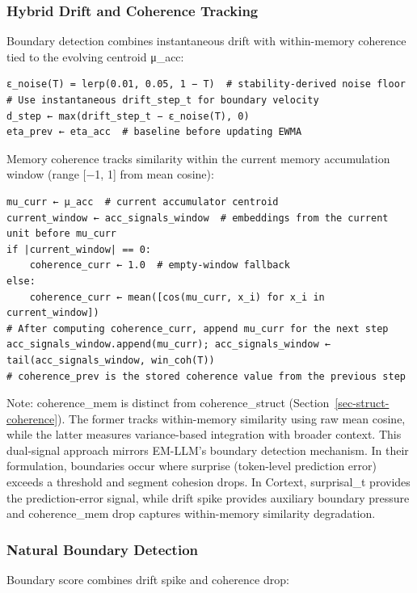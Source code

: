 \documentclass[
  letterpaper,
  DIV=11,
  numbers=noendperiod]{scrartcl}
\begin{document}
\subsubsection{Hybrid Drift and Coherence
Tracking}\label{sec-drift-coherence}

Boundary detection combines instantaneous drift with within-memory
coherence tied to the evolving centroid μ\_acc:

\begin{verbatim}
ε_noise(T) = lerp(0.01, 0.05, 1 − T)  # stability-derived noise floor
# Use instantaneous drift_step_t for boundary velocity
d_step ← max(drift_step_t − ε_noise(T), 0)
eta_prev ← eta_acc  # baseline before updating EWMA
\end{verbatim}

Memory coherence tracks similarity within the current memory
accumulation window (range {[}−1, 1{]} from mean cosine):

\begin{verbatim}
mu_curr ← μ_acc  # current accumulator centroid
current_window ← acc_signals_window  # embeddings from the current unit before mu_curr
if |current_window| == 0:
    coherence_curr ← 1.0  # empty-window fallback
else:
    coherence_curr ← mean([cos(mu_curr, x_i) for x_i in current_window])
# After computing coherence_curr, append mu_curr for the next step
acc_signals_window.append(mu_curr); acc_signals_window ← tail(acc_signals_window, win_coh(T))
# coherence_prev is the stored coherence value from the previous step
\end{verbatim}

Note: coherence\_mem is distinct from coherence\_struct
(Section~\ref{sec-struct-coherence}). The former tracks within-memory
similarity using raw mean cosine, while the latter measures
variance-based integration with broader context. This dual-signal
approach mirrors EM-LLM's boundary detection mechanism. In their
formulation, boundaries occur where surprise (token-level prediction
error) exceeds a threshold and segment cohesion drops. In Cortext,
surprisal\_t provides the prediction-error signal, while drift spike
provides auxiliary boundary pressure and coherence\_mem drop captures
within-memory similarity degradation.

\subsubsection{Natural Boundary Detection}\label{sec-boundary}

Boundary score combines drift spike and coherence drop:
\end{document}
